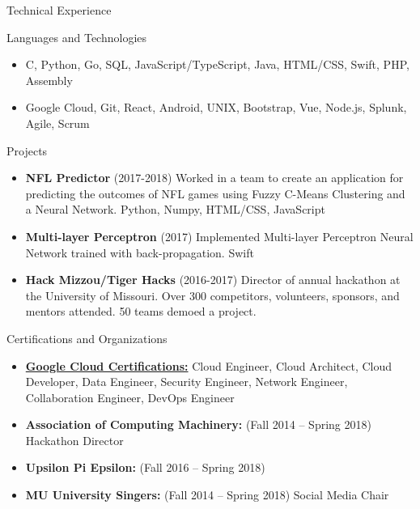 \documentclass[]{mcdowellcv}
\begin{document}
    \begin{cvsection}{Technical Experience}
    
        \begin{cvsubsection}{Languages and Technologies}{}{}
            \begin{itemize}
                \item C, Python, Go, SQL, JavaScript/TypeScript, Java, HTML/CSS, Swift, PHP, Assembly
                \item Google Cloud, Git, React, Android, UNIX, Bootstrap, Vue, Node.js, Splunk, Agile, Scrum
            \end{itemize}
        \end{cvsubsection}

        \begin{cvsubsection}{Projects}{}{}
            \begin{itemize}
               \item \textbf{NFL Predictor} (2017-2018) Worked in a team to create an application for predicting the outcomes of NFL games using Fuzzy C-Means Clustering and a Neural Network. Python, Numpy, HTML/CSS, JavaScript
                \item \textbf{Multi-layer Perceptron} (2017) Implemented Multi-layer Perceptron Neural Network trained with back-propagation. Swift
                \item \textbf{Hack Mizzou/Tiger Hacks} (2016-2017) Director of annual hackathon at the University of Missouri. Over 300 competitors, volunteers, sponsors, and mentors attended. 50 teams demoed a project.
            \end{itemize}
        \end{cvsubsection}

    \end{cvsection}
    
    \begin{cvsection}{Certifications and Organizations}
        \begin{cvsubsection}{}{}{}	
            \begin{itemize}
                \item \href{https://www.credential.net/profile/holtskinner}{\textbf{Google Cloud Certifications:}} Cloud Engineer, Cloud Architect, Cloud Developer, Data Engineer, Security Engineer, Network Engineer, Collaboration Engineer, DevOps Engineer
                \item \textbf{Association of Computing Machinery:} (Fall 2014 -- Spring 2018) Hackathon Director
                \item \textbf{Upsilon Pi Epsilon:}  (Fall 2016 -- Spring 2018)
                \item \textbf{MU University Singers:} (Fall 2014 -- Spring 2018) Social Media Chair
            \end{itemize}
        \end{cvsubsection}
    \end{cvsection}
\end{document}
